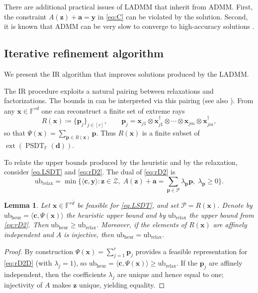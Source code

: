 \documentclass[smallextended]{svjour3}
\newtheorem{lemma}{Lemma}
\newcommand{\cP}{\mathcal P}
\newcommand{\F}{\mathbb F}
\newcommand{\cZ}{\mathcal Z}
\DeclareMathOperator{\SOST}{PSDT}
\newcommand{\1}{\mathbf{1}}
\newcommand{\x}{\mathbf{x}}
\newcommand{\y}{\mathbf{y}}
\newcommand{\p}{\mathbf{p}}
\newcommand{\z}{\mathbf{z}}
\newcommand{\bc}{\mathbf{c}}
\renewcommand{\a}{\mathbf{a}}
\newcommand{\heur}{\text{heur}}
\newcommand{\relx}{\text{relax}}
\newcommand{\ub}{\text{ub}}
\DeclareMathOperator{\ext}{ext}
\DeclareMathOperator{\mtens}{\otimes}
\newcommand{\inner}[2]{\langle #1, #2 \rangle}
\newcommand{\vc}[1]{\mathbf{#1}}
\newcommand{\vd}{\vc{d}}
\newcommand{\deq}{\coloneqq}
\begin{document}
There are additional practical issues of  LADMM that inherit from ADMM. First, the constraint $A(\z) +  \a =  \y$ in \eqref{eq:C} can be violated by the solution. Second, it is known that ADMM can be very slow to converge to
high-accuracy solutions \cite{boyd2011distributed}.

\subsection{Iterative refinement algorithm}

We present the IR algorithm that improves solutions produced by the LADMM.

The IR procedure exploits a natural pairing between relaxations and factorizations. The bounds in  can be interpreted via this pairing (see also ). From any $\x\in\F^{r\bar{d}}$ one can reconstruct a finite set of extreme rays
\[
R(\x) \deq \{\p_j\}_{j\in[r]},\qquad
\p_j = \x_{j1}\mtens \x_{j1}^\dagger\mtens\cdots\mtens\x_{jm}\mtens\x_{jm}^\dagger,
\]
so that $\Psi(\x)=\sum_{\p\in R(\x)}\p$. Thus $R(\x)$ is a finite subset of $\ext(\SOST_{\F}(\vd))$.

To relate the upper bounds produced by the heuristic and by the relaxation, consider \eqref{eq.LSDT} and \eqref{eq:rD2}. The dual of \eqref{eq:rD2} is
\begin{equation}
    \label{eq:rD2D} \tag{DRelDSDTO}
   \ub_{\relx}= \min\{\inner{\bc}{\y}: \z\in\cZ,\; A(\z)+\a=\sum_{\p\in\cP}\lambda_\p\p,\;\lambda_\p\ge0\}.
\end{equation}

\begin{lemma}
    \label{lem.pair}
    Let $\x\in\F^{r\bar{d}}$ be feasible for \eqref{eq.LSDT}, and set $\cP=R(\x)$. Denote by $\ub_{\heur}=\inner{\bc}{\Psi(\x)}$ the heuristic upper bound and by $\ub_{\relx}$ the upper bound from \eqref{eq:rD2}. Then $\ub_{\heur}\ge\ub_{\relx}$. Moreover, if the elements of $R(\x)$ are affinely independent and $A$ is injective, then $\ub_{\heur}=\ub_{\relx}$.
\end{lemma}
\begin{proof}
By construction $\Psi(\x)=\sum_{j=1}^r\p_j$ provides a feasible representation for \eqref{eq:rD2D} (with $\lambda_j=1$), so $\ub_{\heur}=\inner{\bc}{\Psi(\x)}\ge\ub_{\relx}$. If the $\p_j$ are affinely independent, then the coefficients $\lambda_j$ are unique and hence equal to one; injectivity of $A$ makes $\z$ unique, yielding equality.
\end{proof}
\end{document}
